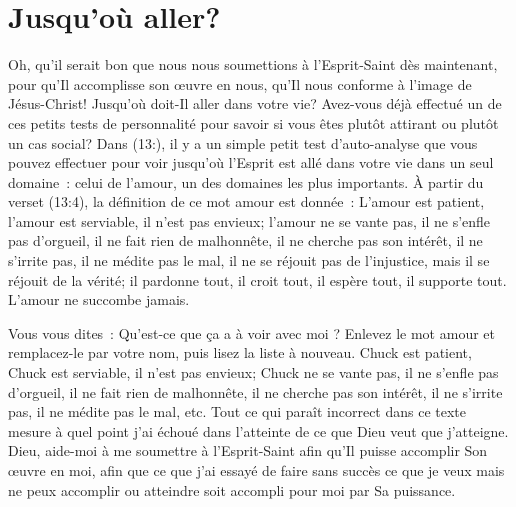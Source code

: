 \section*{Jusqu'où aller?}

Oh, qu'il serait bon que nous nous soumettions à l'Esprit-Saint
 dès maintenant, pour qu'Il accomplisse son œuvre en nous,
 qu'Il nous conforme à l'image de Jésus-Christ!
 Jusqu'où doit-Il aller dans votre vie?
 Avez-vous déjà effectué un de ces petits tests de personnalité pour savoir
 si vous êtes plutôt attirant ou plutôt un cas social?
 Dans (13:), il y a un simple petit test d'auto-analyse
 que vous pouvez effectuer pour voir jusqu'où l'Esprit est allé
 dans votre vie dans un seul domaine~: celui de l'amour,
 un des domaines les plus importants.
 À partir du verset (13:4), la définition
 de ce mot \og amour \fg{} est donnée~:
 \og L'amour est patient, l'amour est serviable, il n'est pas envieux;
 l'amour ne se vante pas, il ne s'enfle pas d'orgueil,
 il ne fait rien de malhonnête, il ne cherche pas son intérêt,
 il ne s'irrite pas, il ne médite pas le mal, il ne se réjouit pas
 de l'injustice, mais il se réjouit de la vérité; il pardonne tout,
 il croit tout, il espère tout, il supporte tout.
 L'amour ne succombe jamais. \fg{}

Vous vous dites~:
 \og Qu'est-ce que ça a à voir avec moi ? \fg{}
 Enlevez le mot \og amour \fg{} et remplacez-le par votre nom,
 puis lisez la liste à nouveau.
 \og Chuck est patient, Chuck est serviable, il n'est pas envieux;
 Chuck ne se vante pas, il ne s'enfle pas d'orgueil, il ne fait rien
 de malhonnête, il ne cherche pas son intérêt, il ne s'irrite pas,
 il ne médite pas le mal, etc. \fg{}
 Tout ce qui paraît incorrect dans ce texte mesure à quel point j'ai échoué
 dans l'atteinte de ce que Dieu veut que j'atteigne.
 Dieu, aide-moi à me soumettre à l'Esprit-Saint afin qu'Il puisse accomplir
 Son œuvre en moi, afin que ce que j'ai essayé de faire sans succès
 \ocadr ce que je veux mais ne peux accomplir ou atteindre \fcadr
 soit accompli pour moi par Sa puissance.
\closechapter

